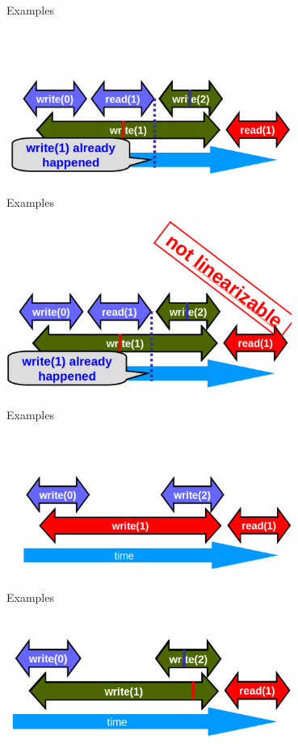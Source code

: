 \begin{frame}{Examples}
\begin{center} \includegraphics[width=0.7\textwidth]{./pics/linear/86.png} \end{center}
\end{frame}

\begin{frame}{Examples}
\begin{center} \includegraphics[width=0.7\textwidth]{./pics/linear/87.png} \end{center}
\end{frame}

\begin{frame}{Examples}
\begin{center} \includegraphics[width=0.7\textwidth]{./pics/linear/88.png} \end{center}
\end{frame}

\begin{frame}{Examples}
\begin{center} \includegraphics[width=0.7\textwidth]{./pics/linear/89.png} \end{center}
\end{frame}

